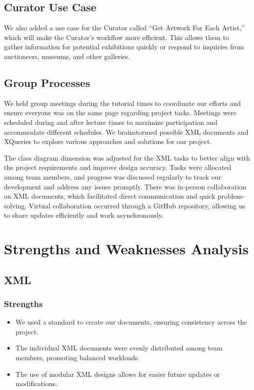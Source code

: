 \documentclass{article} %
\begin{document}
\subsection{Curator Use Case}

We also added a use case for the Curator called “Get Artwork For Each Artist,” which 
will make the Curator's workflow more efficient. This allows them to gather information 
for potential exhibitions quickly or respond to inquiries from auctioneers, museums, and 
other galleries.

\subsection{Group Processes}
We held group meetings during the tutorial times to coordinate our efforts and ensure 
everyone was on the same page regarding project tasks. Meetings were scheduled during 
and after lecture times to maximize participation and accommodate different schedules. 
We brainstormed possible XML documents and XQueries to explore various approaches and 
solutions for our project.

The class diagram dimension was adjusted for the XML tasks to better align with the 
project requirements and improve design accuracy. Tasks were allocated among team 
members, and progress was discussed regularly to track our development and address any 
issues promptly. There was in-person collaboration on XML documents, which facilitated 
direct communication and quick problem-solving. Virtual collaboration occurred through 
a GitHub repository, allowing us to share updates efficiently and work asynchronously.

\section{Strengths and Weaknesses Analysis}

\subsection{XML}

\subsubsection{Strengths}
\begin{itemize}
    \item We used a standard to create our documents, ensuring consistency across the project.
    \item The individual XML documents were evenly distributed among team members, promoting balanced workloads.
    \item The use of modular XML designs allows for easier future updates or modifications.
\end{itemize}
\end{document}
